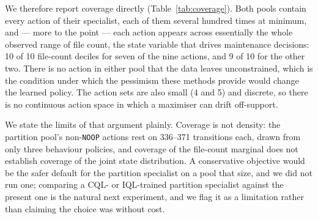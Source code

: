 \documentclass[fleqn,10pt]{wlscirep}
\newcommand{\noop}{\texttt{NOOP}}
\begin{document}
We therefore report coverage directly (Table~\ref{tab:coverage}). Both
pools contain every action of their specialist, each of them several
hundred times at minimum, and --- more to the point --- each action
appears across essentially the whole observed range of file count, the
state variable that drives maintenance decisions: 10 of 10 file-count
deciles for seven of the nine actions, and 9 of 10 for the other two.
There is no action in either pool that the data leaves unconstrained,
which is the condition under which the pessimism these methods provide
would change the learned policy. The action sets are also small (4 and
5) and discrete, so there is no continuous action space in which a
maximiser can drift off-support.

We state the limits of that argument plainly. Coverage is not density:
the partition pool's non-\noop{} actions rest on 336--371 transitions
each, drawn from only three behaviour policies, and coverage of the
file-count marginal does not establish coverage of the joint state
distribution. A conservative objective would be the safer default for
the partition specialist on a pool that size, and we did not run one;
comparing a CQL- or IQL-trained partition specialist against the present
one is the natural next experiment, and we flag it as a limitation
rather than claiming the choice was without cost.
\end{document}
